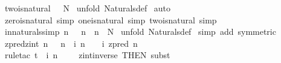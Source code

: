 \begin{isabellebody}
\ two{\isacharunderscore}is{\isacharunderscore}natural{\isacharcolon}\ {\isachardoublequoteopen}{}\ {\isacharcolon}\ {\isacharpercent}N{\isachardoublequoteclose}\isanewline
%
\isadelimproof
%
\endisadelimproof
%
\isatagproof
{}\isamarkupfalse%
\ {\isacharparenleft}unfold\ Naturals{\isacharunderscore}def{\isacharparenright}\isanewline
{}\isamarkupfalse%
\ auto\isanewline
{}\isamarkupfalse%
%
\endisatagproof
{\isafoldproof}%
%
\isadelimproof
\isanewline
%
\endisadelimproof
\isanewline
{}\isamarkupfalse%
\ zero{\isacharunderscore}is{\isacharunderscore}natural\ {\isacharbrackleft}simp{\isacharbrackright}\ one{\isacharunderscore}is{\isacharunderscore}natural\ {\isacharbrackleft}simp{\isacharbrackright}\ two{\isacharunderscore}is{\isacharunderscore}natural\ {\isacharbrackleft}simp{\isacharbrackright}\isanewline
\isanewline
{}\isamarkupfalse%
\ in{\isacharunderscore}naturals{}{\isacharbrackleft}simp{\isacharbrackright}{\isacharcolon}\ {\isachardoublequoteopen}{\isacharbang}{\isacharbang}n{\isachardot}\ {}\ {\isacharless}\ n\ {\isacharequal}{\isacharequal}{\isachargreater}\ {\isacharparenleft}n\ {\isacharcolon}\ {\isacharpercent}N{\isacharparenright}{\isachardoublequoteclose}\isanewline
%
\isadelimproof
%
\endisadelimproof
%
\isatagproof
{}\isamarkupfalse%
\ {\isacharparenleft}unfold\ Naturals{\isacharunderscore}def{\isacharparenright}\isanewline
{}\isamarkupfalse%
\ {\isacharparenleft}simp\ add{\isacharcolon}\ symmetric{\isacharparenright}\isanewline
{}\isamarkupfalse%
%
\endisatagproof
{\isafoldproof}%
%
\isadelimproof
\isanewline
%
\endisadelimproof
\isanewline
\isanewline
\isanewline
{}\isamarkupfalse%
\ zpred{\isacharunderscore}zint{\isacharcolon}\ {\isachardoublequoteopen}{\isacharbang}{\isacharbang}n{\isachardot}\ {}\ {\isacharless}\ n\ {\isacharequal}{\isacharequal}{\isachargreater}\ {\isacharparenleft}{\isacharparenleft}{\isachardollar}i\ n{\isacharparenright}\ {\isacharminus}\ {}{\isacharparenright}\ {\isacharequal}\ {\isacharparenleft}{\isachardollar}i\ {\isacharparenleft}zpred\ n{\isacharparenright}{\isacharparenright}{\isachardoublequoteclose}\isanewline
%
\isadelimproof
%
\endisadelimproof
%
\isatagproof
{}\isamarkupfalse%
\ {\isacharparenleft}rule{\isacharunderscore}tac\ t\ {\isacharequal}\ {\isachardoublequoteopen}{\isacharparenleft}{\isachardollar}i\ n{\isacharparenright}\ {\isacharminus}\ {}\ {\isachardoublequoteclose}\ \ zint{\isacharunderscore}inverse\ {\isacharbrackleft}THEN\ subst{\isacharbrackright}{\isacharparenright}\isanewline

\end{isabellebody}
